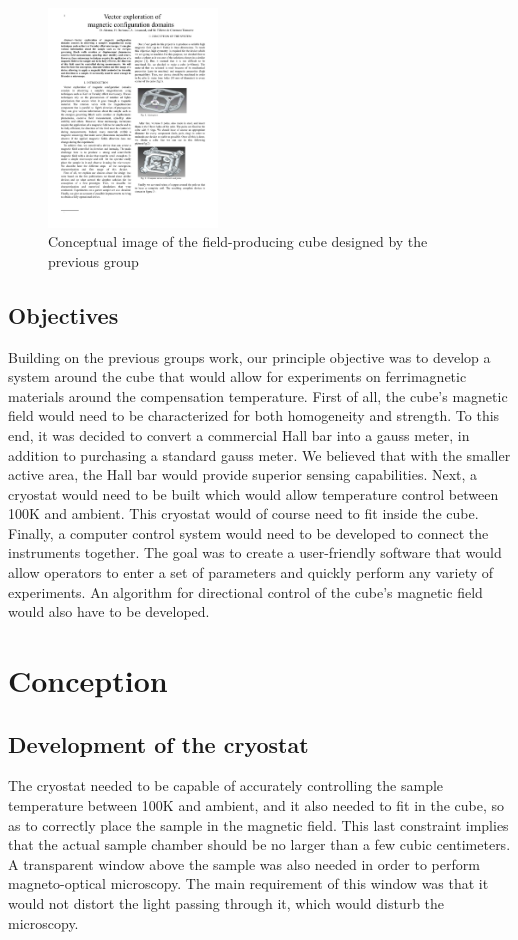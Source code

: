 \documentclass[journal,a4paper]{IEEEtran}
\begin{document}
\begin{figure}[h]
\centering
\includegraphics[width=0.4\textwidth]{cube}
\caption{Conceptual image of the field-producing cube designed by the previous group}
\label{f cube}
\end{figure}

\subsection{Objectives}
Building on the previous groups work, our principle objective was to develop a system around the cube that would allow for experiments on ferrimagnetic materials around the compensation temperature. First of all, the cube's magnetic field would need to be characterized for both homogeneity and strength. To this end, it was decided to convert a commercial Hall bar into a gauss meter, in addition to purchasing a standard gauss meter. We believed that with the smaller active area, the Hall bar would provide superior sensing capabilities. Next, a cryostat would need to be built which would allow temperature control between 100K and ambient. This cryostat would of course need to fit inside the cube. Finally, a computer control system would need to be developed to connect the instruments together. The goal was to create a user-friendly software that would allow operators to enter a set of parameters and quickly perform any variety of experiments. An algorithm for directional control of the cube's magnetic field would also have to be developed. 



\section{Conception}
\subsection{Development of the cryostat}
The cryostat needed to be capable of accurately controlling the sample temperature between 100K and ambient, and it also needed to fit in the cube, so as to correctly place the sample in the magnetic field. This last constraint implies that the actual sample chamber should be no larger than a few cubic centimeters. A transparent window above the sample was also needed in order to perform magneto-optical microscopy. The main requirement of this window was that it would not distort the light passing through it, which would disturb the microscopy.
\end{document}
